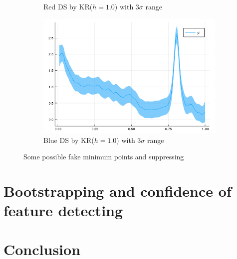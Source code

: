 \documentclass{article}
\begin{document}
\begin{figure}[htb]
\begin{subfigure}[b]{0.24\linewidth}
    \caption{Red DS by KR($h=1.0$) with 3$\sigma$ range}
  \end{subfigure}
  \begin{subfigure}[b]{0.24\linewidth}
    \includegraphics[width=\linewidth]{images/kde_reg_b.png}
    \caption{Blue DS by KR($h=1.0$) with 3$\sigma$ range}
  \end{subfigure}
  \caption{Some possible fake minimum points and suppressing}
  \label{fig:DS_REG}
\end{figure}


\section{Bootstrapping and confidence of feature detecting}

\section{Conclusion}




  
\end{document}
